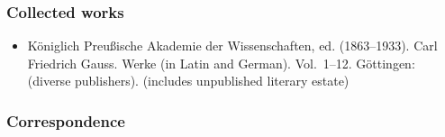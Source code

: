 \subsubsection{Collected works}\label{Collected_works}

\begin{itemize}
\tightlist
\item
  {Königlich Preußische Akademie der Wissenschaften, ed. (1863--1933). Carl Friedrich Gauss. Werke (in Latin and German). Vol.{~}{1--}12. Göttingen: (diverse publishers).{} (includes unpublished literary estate)}
\end{itemize}


\subsubsection{Correspondence}\label{Correspondence}

